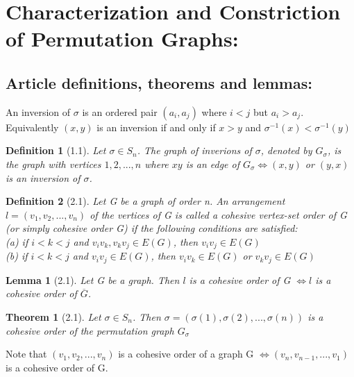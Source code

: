 \documentclass{article}
\newtheorem*{definition}{Definition}
\newtheorem*{theorem}{Theorem}
\newtheorem*{lemma}{Lemma}
\begin{document}
\pagestyle{empty}

\begin{comment}
definitions
\end{comment}

\section{ Characterization and Constriction of Permutation Graphs: }
\subsection{ Article definitions, theorems and lemmas: }
An inversion of $\sigma$ is an ordered pair $(a_i, a_j)$ where $i < j$ but $a_i > a_j$. Equivalently $(x, y)$ is an inversion if and only if $x > y$ and $\sigma^{-1}(x) < \sigma^{-1}(y)$ 

\begin{definition}[1.1]
    Let $\sigma \in S_n$. The graph of inverions of $\sigma$, denoted by $G_{\sigma}$, is the graph with vertices $1,2,...,n$ where $xy$ is an edge of $G_{\sigma} \Leftrightarrow (x, y)$ or $(y, x)$ is an inversion of $\sigma$. 
\end{definition}

\begin{definition}[2.1]
    Let G be a graph of order n. An arrangement $l = (v_1, v_2, ..., v_n)$ of the vertices of G is called a cohesive vertex-set order of G (or simply cohesive order G) if the following conditions are satisfied:\\
    (a) if $i < k < j$ and $v_iv_k, v_kv_j \in E(G)$, then $v_iv_j \in E(G)$ \\
    (b) if $i < k < j$ and $v_iv_j \in E(G)$, then $v_iv_k \in E(G)$ or $v_kv_j \in E(G)$ \\
\end{definition}

\begin{lemma}[2.1]
    Let G be a graph. Then $l$ is a cohesive order of G $\Leftrightarrow l$ is a cohesive order of $\overline{G}$.
\end{lemma}

\begin{theorem}[2.1]
    Let $\sigma \in S_n$. Then $\sigma = (\sigma(1),\sigma(2),...,\sigma(n))$ is a cohesive order of the permutation graph $G_{\sigma}$
\end{theorem}

Note that $(v_1, v_2, ..., v_n)$ is a cohesive order of a graph G $\Leftrightarrow (v_n, v_{n-1}, ..., v_1)$ is a cohesive order of G.
\end{document}
